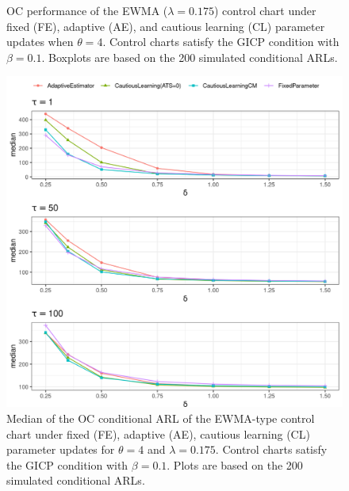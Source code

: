 \begin{figure}
\begin{subfigure}{0.49\textwidth}
\end{subfigure}
  \caption{OC performance of the EWMA ($ \lambda = 0.175$) control chart under fixed (FE), adaptive (AE), and cautious learning (CL) parameter updates when $ \theta = 4$.
    Control charts satisfy the GICP condition  with $ \beta = 0.1$.
  Boxplots are based on the 200 simulated conditional ARLs.}
  \label{fig:lambda=0.175/EWMA OC theta=4}
\end{figure}

\begin{figure}
  \includegraphics[width=\textwidth]{img/sims/theta=4.0_signedEWMA(l = 0.175, upw = true, L = 1.0)/OC-profiles.png}
  \caption{Median of the OC conditional ARL of the EWMA-type control chart under fixed (FE), adaptive (AE), cautious learning (CL) parameter updates for $ \theta = 4$ and $ \lambda = 0.175$.
    Control charts satisfy the GICP condition  with $ \beta = 0.1$.
  Plots are based on the 200 simulated conditional ARLs.}
  \label{fig:lambda=0.05/EWMA OC profiles}
\end{figure}


